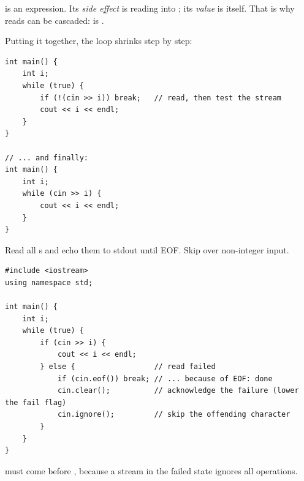 \begin{important}
 is an expression. Its \emph{side effect} is reading into
; its \emph{value} is  itself. That is why reads can be
cascaded:  is .
\end{important}
\begin{center}
\end{center}

Putting it together, the loop shrinks step by step:
\begin{lstlisting}[style=cpp]
int main() {
    int i;
    while (true) {
        if (!(cin >> i)) break;   // read, then test the stream
        cout << i << endl;
    }
}

// ... and finally:
int main() {
    int i;
    while (cin >> i) {
        cout << i << endl;
    }
}
\end{lstlisting}

\begin{example}
Read all s and echo them to stdout until EOF. Skip over non-integer
input.
\begin{lstlisting}[style=cpp]
#include <iostream>
using namespace std;

int main() {
    int i;
    while (true) {
        if (cin >> i) {
            cout << i << endl;
        } else {                  // read failed
            if (cin.eof()) break; // ... because of EOF: done
            cin.clear();          // acknowledge the failure (lower the fail flag)
            cin.ignore();         // skip the offending character
        }
    }
}
\end{lstlisting}
 must come before , because a stream in the
failed state ignores all operations.
\end{example}

